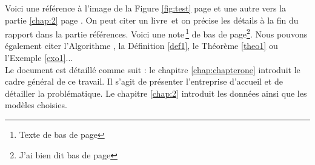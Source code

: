\sloppy


Voici une référence à l'image de la Figure \ref{fig:test} page \pageref{fig:test} et une autre vers la partie \ref{chap:2} page \pageref{chap:2}.
On peut citer un livre\, \cite{caillois1} et on précise les détails à la fin du rapport dans la partie références.
Voici une note\,\footnote{Texte de bas de page} de bas de page\footnote{J'ai bien dit bas de page}. Nous pouvons également citer l'Algorithme , la Définition \ref{def1}, le Théorème \ref{theo1} ou l'Exemple \ref{exo1}...\\

Le document est détaillé comme suit : le chapitre \ref{chap:chapterone} introduit le cadre général de ce travail. Il s'agit de présenter l'entreprise d'accueil et de détailler la problématique. Le chapitre \ref{chap:2} introduit les données ainsi que les modèles choisies. 


